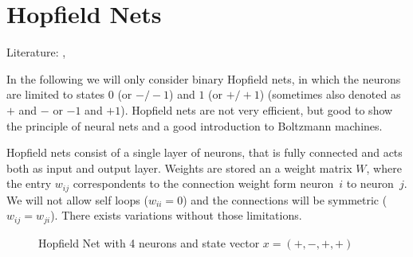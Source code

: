 \section{Hopfield Nets}\label{sec:hopfield-nets}%
Literature: \cite[Chapter 5.5]{Patterson1997}, \cite{Storkey1997}

In the following we will only consider binary Hopfield nets, in which the neurons are limited to states $0$ (or $-/-1$) and $1$ (or $+/+1$) (sometimes also denoted as $+$ and $-$ or $-1$ and $+1$).
Hopfield nets are not very efficient, but good to show the principle of neural nets and a good introduction to Boltzmann machines.

Hopfield nets consist of a single layer of neurons, that is fully connected and acts both as input and output layer. Weights are stored an a weight matrix $W$, where the entry $w_{ij}$ correspondents to the connection weight form neuron~$i$ to neuron~$j$. We will not allow self loops ($w_{ii} = 0$) and the connections will be symmetric ($w_{ij}=w_{ji}$). There exists variations without those limitations.

\begin{figure}
\centering
{}
\caption{Hopfield Net with 4 neurons and state vector $x = (+, -, +, +)$}
\label{fig:hopfield-net}
\end{figure}

